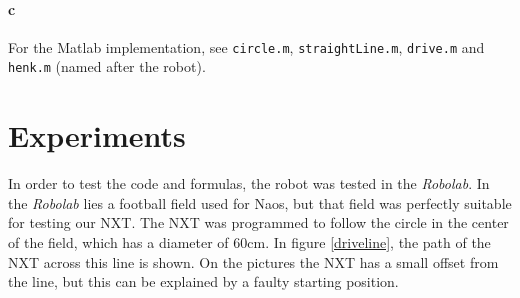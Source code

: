 \documentclass[12pt]{article}
\begin{document}
\paragraph{c} For the Matlab implementation, see \verb|circle.m|, \verb|straightLine.m|, \verb|drive.m| and \verb|henk.m| (named after the robot).
\clearpage
\section{Experiments}
In order to test the code and formulas, the robot was tested in the \textit{Robolab}. In the \textit{Robolab} lies a football field used for Naos, but that field was perfectly suitable for testing our NXT. The NXT was programmed to follow the circle in the center of the field, which has a diameter of 60cm. In figure \ref{driveline}, the path of the NXT across this line is shown. On the pictures the NXT has a small offset from the line, but this can be explained by a faulty starting position. \\
\end{document}
